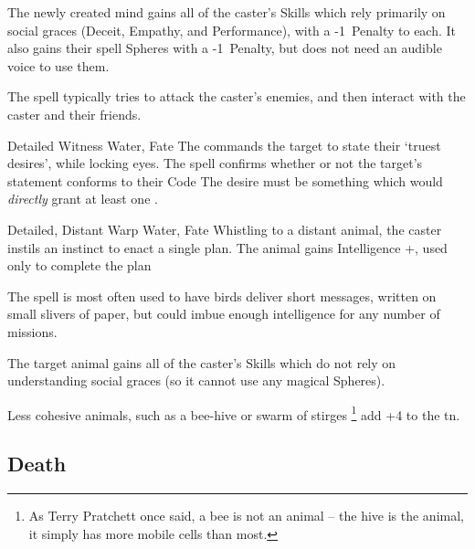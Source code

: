\begin{multicols}{2}
{  The newly created mind gains all of the caster's Skills which rely primarily on social graces (Deceit, Empathy, and Performance), with a -1~Penalty to each.
  It also gains their spell Spheres with a -1~Penalty, but does not need an audible voice to use them.

  The spell typically tries to attack the caster's enemies, and then interact with the caster and their friends.

  }

  {Detailed}%
  {Witness}%
  {Water, Fate}%
  {}%
  {The  commands the target to state their `truest desires', while locking eyes.
    The spell confirms whether or not the target's statement conforms to their Code}%
  {The desire must be something which would \textit{directly} grant at least one .%
  }

\label{carrierCrow}
  {Detailed, Distant}%
  {Warp}%
  {Water, Fate}%
  {}%
  {Whistling to a distant animal, the caster instils an instinct to enact a single plan.
  The animal gains Intelligence +, used only to complete the plan}%
  {
  The spell is most often used to have birds deliver short messages, written on small slivers of paper, but could imbue enough intelligence for any number of missions.

  The target animal gains all of the caster's Skills which do not rely on understanding social graces (so it cannot use any magical Spheres).

  Less cohesive animals, such as a bee-hive or swarm of stirges%
  \footnote{As Terry Pratchett once said, a bee is not an animal -- the hive is the animal, it simply has more mobile cells than most.}
  add +4 to the \gls{tn}.
  }




\subsection{Death}
\label{deathSpells}
\label{Death1}




\end{multicols}
